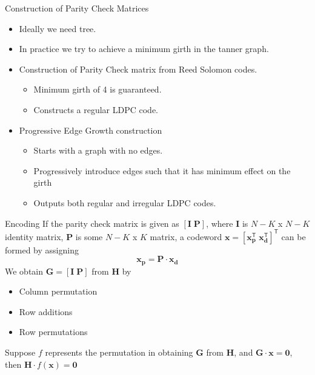 \documentclass{beamer}
\begin{document}
 \begin{frame}{Construction of Parity Check Matrices}
  \begin{itemize}\itemsep 0.3cm
   \item Ideally we need tree.
   \item In practice we try to achieve a minimum girth in the tanner graph.
   \item Construction of Parity Check matrix from Reed Solomon codes.
   \begin{itemize}
    \item Minimum girth of 4 is guaranteed.
    \item Constructs a regular LDPC code.
   \end{itemize}
   \item Progressive Edge Growth construction
   \begin{itemize}
    \item Starts with a graph with no edges.
    \item Progressively introduce edges such that it has minimum effect on the girth
    \item Outputs both regular and irregular LDPC codes.
   \end{itemize}
  \end{itemize}
 \end{frame}
 
   \begin{frame}{Encoding}
   If the parity check matrix is given as $\mathbf{\left[{I \; P}\right]}$, where $\mathbf{I}$ is $N - K$ x $N - K$ identity matrix, $\mathbf{P}$ is some $N - K$ x $K$ matrix,
   a codeword $\mathbf{x = \left[x_p^{\mathsf{T}} \; x_d^{\mathsf{T}}\right]^{\mathsf{T}}}$ can be formed by assigning
    \begin{equation}\nonumber
    \mathbf{x_p = P \cdot x_d}
    \end{equation}
   We obtain $\mathbf{G = \left[{I \; P}\right]}$ from $\mathbf{H}$ by
   \begin{itemize}
    \item Column permutation
    \item Row additions
    \item Row permutations
   \end{itemize}
   Suppose $f$ represents the permutation in obtaining $\mathbf{G}$ from $\mathbf{H}$, and $\mathbf{G \cdot x = 0}$, then $\mathbf{H} \cdot f(\mathbf{x}) = \mathbf{0}$  
  \end{frame}
\end{document}
